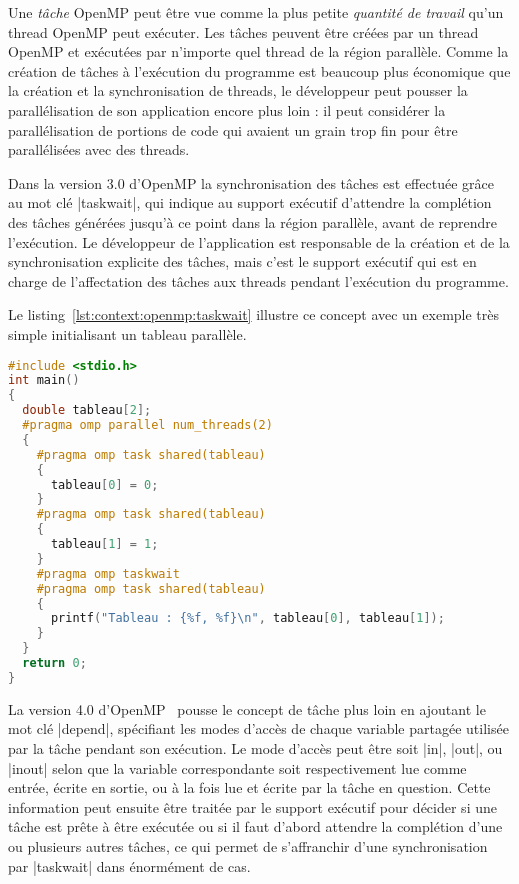 Une \emph{tâche} OpenMP peut être vue comme la plus petite \emph{quantité de travail} qu'un thread OpenMP peut exécuter.
Les tâches peuvent être créées par un thread OpenMP et exécutées par n'importe quel thread de la région parallèle.
Comme la création de tâches à l'exécution du programme est beaucoup plus économique que la création et la synchronisation de threads, le développeur peut pousser la parallélisation de son application encore plus loin : il peut considérer la parallélisation de portions de code qui avaient un grain trop fin pour être parallélisées avec des threads.

Dans la version 3.0 d'OpenMP la synchronisation des tâches est effectuée grâce au mot clé |taskwait|, qui indique au support exécutif d'attendre la complétion des tâches générées jusqu'à ce point dans la région parallèle, avant de reprendre l'exécution.
Le développeur de l'application est responsable de la création et de la synchronisation explicite des tâches, mais c'est le support exécutif qui est en charge de l'affectation des tâches aux threads pendant l'exécution du programme.

Le listing~\ref{lst:context:openmp:taskwait} illustre ce concept avec un exemple très simple initialisant un tableau parallèle.

\begin{lstlisting}[language=c++,caption=Création et synchronisation explicite de tâches,label=lst:context:openmp:taskwait,basicstyle=\small]
#include <stdio.h>
int main()
{
  double tableau[2];
  #pragma omp parallel num_threads(2)
  {
    #pragma omp task shared(tableau)
    {
      tableau[0] = 0;
    }
    #pragma omp task shared(tableau)
    {
      tableau[1] = 1;
    }
    #pragma omp taskwait
    #pragma omp task shared(tableau)
    {
      printf("Tableau : {%f, %f}\n", tableau[0], tableau[1]);
    }
  }
  return 0;
}
\end{lstlisting}


La version 4.0 d'OpenMP~\cite{openmp40} pousse le concept de tâche plus loin en ajoutant le mot clé |depend|, spécifiant les modes d'accès de chaque variable partagée utilisée par la tâche pendant son exécution.
Le mode d'accès peut être soit |in|, |out|, ou |inout| selon que la variable correspondante soit respectivement lue comme entrée, écrite en sortie, ou à la fois lue et écrite par la tâche en question.
Cette information peut ensuite être traitée par le support exécutif pour décider si une tâche est prête à être exécutée ou si il faut d'abord attendre la complétion d'une ou plusieurs autres tâches, ce qui permet de s'affranchir d'une synchronisation par |taskwait| dans énormément de cas.

